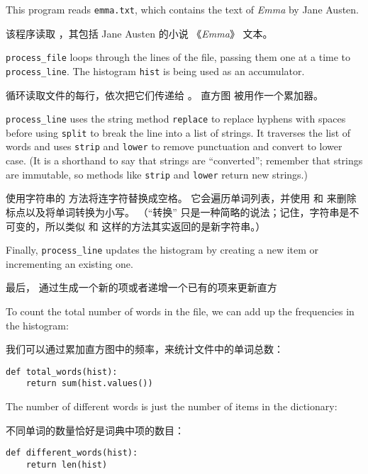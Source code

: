 %
This program reads {\tt emma.txt}, which contains the text of {\em
  Emma} by Jane Austen.

该程序读取  ，其包括 Jane Austen 的小说 《{\em Emma}》 文本。


\verb"process_file" loops through the lines of the file,
passing them one at a time to \verb"process_line".  The histogram
{\tt hist} is being used as an accumulator.

 循环读取文件的每行，依次把它们传递给  。
直方图  被用作一个累加器。


\verb"process_line" uses the string method {\tt replace} to replace
hyphens with spaces before using {\tt split} to break the line into a
list of strings.  It traverses the list of words and uses {\tt strip}
and {\tt lower} to remove punctuation and convert to lower case.  (It
is a shorthand to say that strings are ``converted''; remember that
strings are immutable, so methods like {\tt strip} and {\tt lower}
return new strings.)

 使用字符串的  方法将连字符替换成空格。
它会遍历单词列表，并使用  和  来删除标点以及将单词转换为小写。
（``转换'' 只是一种简略的说法；记住，字符串是不可变的，所以类似  和  这样的方法其实返回的是新字符串。）

Finally, \verb"process_line" updates the histogram by creating a new
item or incrementing an existing one.

最后， 通过生成一个新的项或者递增一个已有的项来更新直方


To count the total number of words in the file, we can add up
the frequencies in the histogram:

我们可以通过累加直方图中的频率，来统计文件中的单词总数：

\begin{lstlisting}
def total_words(hist):
    return sum(hist.values())
\end{lstlisting}
%
The number of different words is just the number of items in
the dictionary:

不同单词的数量恰好是词典中项的数目：

\begin{lstlisting}
def different_words(hist):
    return len(hist)
\end{lstlisting}

